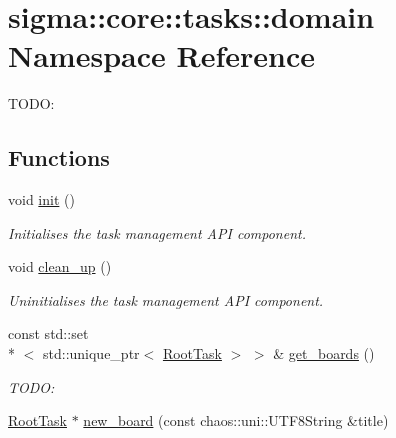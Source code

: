\hypertarget{namespacesigma_1_1core_1_1tasks_1_1domain}{\section{sigma\-:\-:core\-:\-:tasks\-:\-:domain Namespace Reference}
\label{namespacesigma_1_1core_1_1tasks_1_1domain}
}


T\-O\-D\-O\-:  


\subsection*{Functions}
\begin{DoxyCompactItemize}
\item 
void \hyperlink{namespacesigma_1_1core_1_1tasks_1_1domain_a1c9e74f15ced5d6050449521f089d293}{init} ()
\begin{DoxyCompactList}\small\item\em Initialises the task management A\-P\-I component. \end{DoxyCompactList}\item 
void \hyperlink{namespacesigma_1_1core_1_1tasks_1_1domain_a5133e92ea740e153728af3fd8d872d36}{clean\-\_\-up} ()
\begin{DoxyCompactList}\small\item\em Uninitialises the task management A\-P\-I component. \end{DoxyCompactList}\item 
\hypertarget{namespacesigma_1_1core_1_1tasks_1_1domain_ae85ad90e7ee1bf783a0da97bb553f93a}{const std\-::set\\*
$<$ std\-::unique\-\_\-ptr$<$ \hyperlink{classsigma_1_1core_1_1tasks_1_1_root_task}{Root\-Task} $>$ $>$ \& \hyperlink{namespacesigma_1_1core_1_1tasks_1_1domain_ae85ad90e7ee1bf783a0da97bb553f93a}{get\-\_\-boards} ()}\label{namespacesigma_1_1core_1_1tasks_1_1domain_ae85ad90e7ee1bf783a0da97bb553f93a}

\begin{DoxyCompactList}\small\item\em T\-O\-D\-O\-: \end{DoxyCompactList}\item 
\hypertarget{namespacesigma_1_1core_1_1tasks_1_1domain_a876d28fa6539e8dbeea2e0a48ed1f460}{\hyperlink{classsigma_1_1core_1_1tasks_1_1_root_task}{Root\-Task} $\ast$ \hyperlink{namespacesigma_1_1core_1_1tasks_1_1domain_a876d28fa6539e8dbeea2e0a48ed1f460}{new\-\_\-board} (const chaos\-::uni\-::\-U\-T\-F8\-String \&title)}\label{namespacesigma_1_1core_1_1tasks_1_1domain_a876d28fa6539e8dbeea2e0a48ed1f460}


\end{DoxyCompactItemize}
